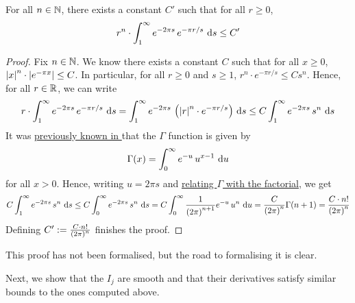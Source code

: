 \begin{boxlemma}\label{Ch4:Lemma:Bessel_Bound}
    For all $n \in \mathbb{N}$, there exists a constant $C'$ such that for all $r \geq 0$,
    \begin{align*}
        r^n \cdot \int_{1}^{\infty} e^{-2\pi s} \, e^{-\pi r /s} \, \operatorname{d}\!{s} \leq C'
    \end{align*}
\end{boxlemma}
\begin{proof}
    Fix $n \in \mathbb{N}$. We know there exists a constant $C$ such that for all $x \geq 0$, $\left\lvert x \right\rvert^n \cdot \left\lvert e^{-\pi x} \right\rvert \leq C$. In particular, for all $r \geq 0$ and $s \geq 1$, $r^n \cdot e^{-\pi r/s} \leq C s^n$. Hence, for all $r \in \mathbb{R}$, we can write
    \begin{align*}
        r \cdot \int_{1}^{\infty} e^{-2\pi s} \, e^{-\pi r /s} \, \operatorname{d}\!{s}
        = \int_{1}^{\infty} e^{-2\pi s} \, \left( \left\lvert r \right\rvert^n \cdot e^{-\pi r /s} \right) \, \operatorname{d}\!{s}
        \leq C \int_{1}^{\infty} e^{-2\pi s} \, s^n \, \operatorname{d}\!{s}
    \end{align*}
    It was \href{https://github.com/leanprover-community/mathlib4/blob/5a2eaa85c555c4263e15928cef249cbaad2eb2d2/Mathlib/Analysis/SpecialFunctions/Gamma/Basic.lean#L403}{previously known in \mathlib} that the $\Gamma$ function is given by
    \begin{align*}
        \Gamma(x) = \int_{0}^{\infty} e^{-u} \, u^{x-1} \, \operatorname{d}\!{u}
    \end{align*}
    for all $x > 0$. Hence, writing $u = 2\pi s$ and \href{https://github.com/leanprover-community/mathlib4/blob/5a2eaa85c555c4263e15928cef249cbaad2eb2d2/Mathlib/Analysis/SpecialFunctions/Gamma/Basic.lean#L430}{relating $\Gamma$ with the factorial}, we get
    \begin{align*}
        C \int_{1}^{\infty} e^{-2\pi s} \, s^n \, \operatorname{d}\!{s}
        \leq C \int_{0}^{\infty} e^{-2\pi s} \, s^n \, \operatorname{d}\!{s}
        = C \int_{0}^{\infty} \frac{1}{\left( 2\pi \right)^{n+1}} e^{-u} \, u^n \, \operatorname{d}\!{u}
        = \frac{C}{\left( 2\pi \right)^n} \Gamma\!\left( n + 1 \right)
        = \frac{C \cdot n!}{\left( 2\pi \right)^n}
    \end{align*}
    Defining $C' := \frac{C \cdot n!}{\left( 2\pi \right)^n}$ finishes the proof.
\end{proof}

This proof has not been formalised, but the road to formalising it is clear.

Next, we show that the $I_j$ are smooth and that their derivatives satisfy similar bounds to the ones computed above.

